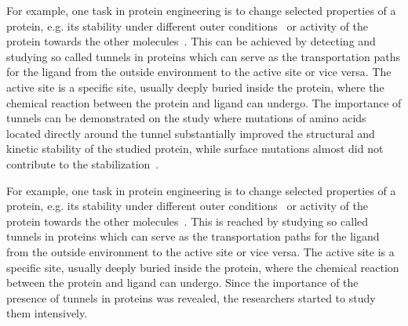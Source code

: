 \documentclass{llncs}
\begin{document}
 For example, one task in protein engineering is to change selected properties of a protein, e.g. its stability under different outer conditions~\cite{Koudelakova2013} or activity of the protein towards the other molecules~\cite{Pavlova2009}.
This can be achieved by detecting and studying so called tunnels in proteins which can serve as the transportation paths for the 
ligand from the outside environment to the active site or vice versa. 
The active site is a specific site, usually deeply buried inside the protein, 
    where the chemical reaction between the protein and ligand can undergo. 
The importance of tunnels can be demonstrated on the study where mutations of amino acids located directly around the tunnel substantially improved the structural and kinetic stability of the studied protein, while
surface mutations almost did not contribute to the stabilization~\cite{Koudelakova2013}.

For example, one task in protein engineering is to change selected properties of a protein, e.g. its stability under different outer conditions~\cite{Koudelakova2013} or activity of the protein towards the other molecules~\cite{Pavlova2009}.
This is reached by studying so called tunnels in proteins which can serve as the transportation paths for the ligand from the outside environment to the active site or vice versa.
The active site is a specific site, usually deeply buried inside the protein, where the chemical reaction between the protein and ligand can undergo.
Since the importance of the presence of tunnels in proteins was revealed, the researchers started to study them intensively.
\end{document}

